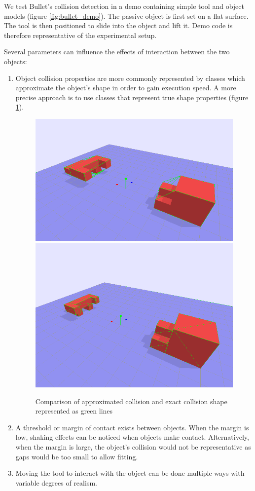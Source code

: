 \documentclass[11]{article}
\begin{document}
We test Bullet's collision detection in a demo containing simple tool and object models (figure \ref{fig:bullet_demo}).
The passive object is first set on a flat surface.
The tool is then positioned to slide into the object and lift it.
Demo code is therefore representative of the experimental setup.  

Several parameters can influence the effects of interaction between the two objects:
\begin{enumerate}
\item Object collision properties are more commonly represented by classes which approximate the object's shape in order to gain execution speed.
A more precise approach is to use classes that represent true shape properties (figure \ref{fig:collision_shape}).   

\begin{figure}[h]
\centering
\includegraphics[width=.48\textwidth]{figures/collision_approximation.png}
\includegraphics[width=.41\textwidth]{figures/collision_exact.png}
\caption{Comparison of approximated collision and exact collision shape represented as green lines}
\label{fig:collision_shape}
\end{figure}      

\item A threshold or margin of contact exists between objects. 
When the margin is low, shaking effects can be noticed when objects make contact. 
Alternatively, when the margin is large, the object's collision would not be representative as gaps would be too small to allow fitting. 

\item Moving the tool to interact with the object can be done multiple ways with variable degrees of realism.
\end{enumerate}
\end{document}
